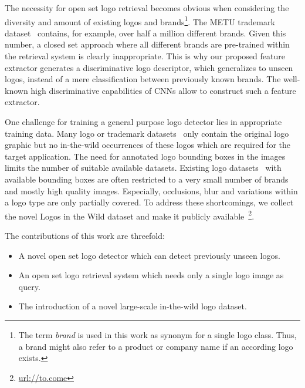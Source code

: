 \documentclass[a4paper,twoside]{article}
\begin{document}

The necessity for open set logo retrieval becomes obvious when considering the diversity and amount of existing logos and brands\footnote{The term \textit{brand} is used in this work as synonym for a single logo class. Thus, a brand might also refer to a product or company name if an according logo exists.}. The METU trademark dataset~\cite{tursun2017} contains, for example, over half a million different brands. Given this number, a closed set approach where all different brands are pre-trained within the retrieval system is clearly inappropriate.
This is why our proposed feature extractor generates a discriminative logo descriptor, which generalizes to unseen logos, instead of a mere classification between previously known brands. The well-known high discriminative capabilities of \acp{CNN} allow to construct such a feature extractor.

One challenge for training a general purpose logo detector lies in appropriate training data. Many logo or trademark datasets~\cite{eakins1998,hoi2015,tursun2017} only contain the original logo graphic but no in-the-wild occurrences of these logos which are required for the target application. The need for annotated logo bounding boxes in the images limits the number of suitable available datasets. Existing logo datasets~\cite{joly2009,kalantidis2011,romberg2011,letessier2012,bianco2015,su2016,bianco2017} with available bounding boxes are often restricted to a very small number of brands and mostly high quality images. Especially, occlusions, blur and variations within a logo type are only partially covered.
To address these shortcomings, we collect the novel Logos in the Wild dataset and make it publicly available~\footnote{\url{url://to.come}}.

The contributions of this work are threefold:
\begin{itemize}
\item A novel open set logo detector which can detect previously unseen logos.
\item An open set logo retrieval system which needs only a single logo image as query.
\item The introduction of a novel large-scale in-the-wild logo dataset.
\end{itemize}
\end{document}
